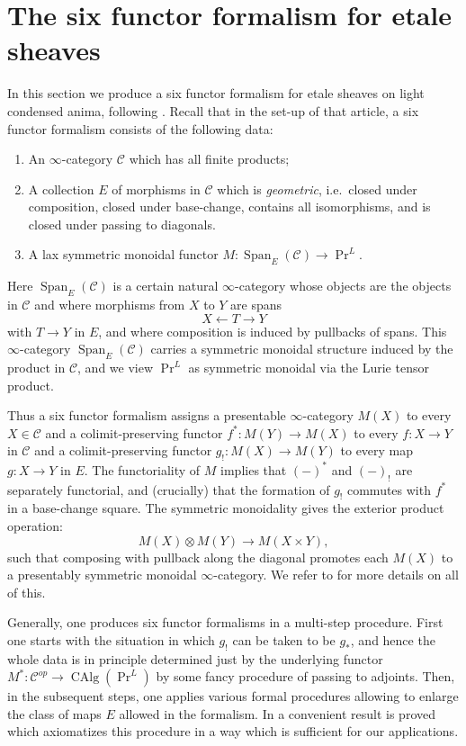 \documentclass[12pt]{article}
\newcommand{\on}{\operatorname}
\begin{document}
\section{The six functor formalism for etale sheaves}\label{sixsec}

In this section we produce a six functor formalism for etale sheaves on light condensed anima, following \cite{HeyerSixFunctors}.  Recall that in the set-up of that article, a six functor formalism consists of the following data:
\begin{enumerate}
\item An $\infty$-category $\mathcal{C}$ which has all finite products;
\item A collection $E$ of morphisms in $\mathcal{C}$ which is \emph{geometric}, i.e.\ closed under composition, closed under base-change, contains all isomorphisms, and is closed under passing to diagonals.
\item A lax symmetric monoidal functor $M:\on{Span}_E(\mathcal{C})\to \on{Pr}^L$.
\end{enumerate}

Here $\on{Span}_E(\mathcal{C})$ is a certain natural $\infty$-category whose objects are the objects in $\mathcal{C}$ and where morphisms from $X$ to $Y$ are spans
$$X\leftarrow T\rightarrow Y$$
with $T\rightarrow Y$ in $E$, and where composition is induced by pullbacks of spans.  This $\infty$-category $\on{Span}_E(\mathcal{C})$ carries a symmetric monoidal structure induced by the product in $\mathcal{C}$, and we view $\on{Pr}^L$ as symmetric monoidal via the Lurie tensor product.

Thus a six functor formalism assigns a presentable $\infty$-category $M(X)$ to every $X\in\mathcal{C}$ and a colimit-preserving functor $f^\ast:M(Y)\to M(X)$ to every $f:X\to Y$ in $\mathcal{C}$ and a colimit-preserving functor $g_!:M(X)\to M(Y)$ to every map $g:X\to Y$ in $E$.  The functoriality of $M$ implies that $(-)^\ast$ and $(-)_!$ are separately functorial, and (crucially) that the formation of $g_!$ commutes with $f^\ast$ in a base-change square.  The symmetric monoidality gives the exterior product operation:
$$M(X)\otimes M(Y)\to M(X\times Y),$$
such that composing with pullback along the diagonal promotes each $M(X)$ to a presentably symmetric monoidal $\infty$-category.  We refer to \cite{HeyerSixFunctors} for more details on all of this.

Generally, one produces six functor formalisms in a multi-step procedure.  First one starts with the situation in which $g_!$ can be taken to be $g_\ast$, and hence the whole data is in principle determined just by the underlying functor $M^\ast:\mathcal{C}^{op}\to\on{CAlg}(\on{Pr}^L)$ by some fancy procedure of passing to adjoints.  Then, in the subsequent steps, one applies various formal procedures allowing to enlarge the class of maps $E$ allowed in the formalism.  In \cite{HeyerSixFunctors} a convenient result is proved which axiomatizes this procedure in a way which is sufficient for our applications.
\end{document}
